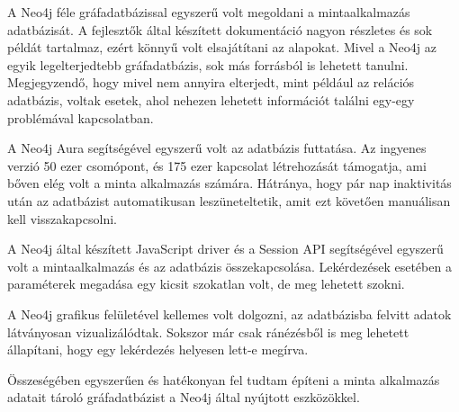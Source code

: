 


A Neo4j féle gráfadatbázissal egyszerű volt megoldani a mintaalkalmazás adatbázisát. A fejlesztők által készített dokumentáció nagyon részletes és sok példát tartalmaz, ezért könnyű volt elsajátítani az alapokat. Mivel a Neo4j az egyik legelterjedtebb gráfadatbázis, sok más forrásból is lehetett tanulni. Megjegyzendő, hogy mivel nem annyira elterjedt, mint például az relációs adatbázis, voltak esetek, ahol nehezen lehetett információt találni egy-egy problémával kapcsolatban. 

\bigskip

A Neo4j Aura segítségével egyszerű volt az adatbázis futtatása. Az ingyenes verzió 50 ezer csomópont, és 175 ezer kapcsolat létrehozását támogatja, ami bőven elég volt a minta alkalmazás számára. Hátránya, hogy pár nap inaktivitás után az adatbázist automatikusan leszüneteltetik, amit ezt követően manuálisan kell visszakapcsolni.

\bigskip

A Neo4j által készített JavaScript driver és a Session API segítségével egyszerű volt a mintaalkalmazás és az adatbázis összekapcsolása. Lekérdezések esetében a paraméterek megadása egy kicsit szokatlan volt, de meg lehetett szokni.

\bigskip

A Neo4j grafikus felületével kellemes volt dolgozni, az adatbázisba felvitt adatok látványosan vizualizálódtak. Sokszor már csak ránézésből is meg lehetett állapítani, hogy egy lekérdezés helyesen lett-e megírva.

\bigskip

Összeségében egyszerűen és hatékonyan fel tudtam építeni a minta alkalmazás adatait tároló gráfadatbázist a Neo4j által nyújtott eszközökkel.